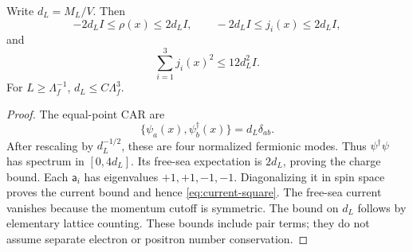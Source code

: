 \begin{lemma}
\label{lem:local}
Write \(d_L=M_L/V\). Then
\begin{equation}
-2d_L I\le\rho(x)\le2d_L I,\qquad
-2d_L I\le j_i(x)\le2d_L I,
\label{eq:local-bounds}
\end{equation}
and
\begin{equation}
\sum_{i=1}^3j_i(x)^2\le12d_L^2I.
\label{eq:current-square}
\end{equation}
For \(L\ge\Lambda_f^{-1}\), \(d_L\le C\Lambda_f^3\).
\end{lemma}
\begin{proof}
The equal-point CAR are
\begin{equation}
\{\psi_a(x),\psi_b^\dagger(x)\}=d_L\delta_{ab}.
\end{equation}
After rescaling by \(d_L^{-1/2}\), these are four normalized fermionic modes.
Thus \(\psi^\dagger\psi\) has spectrum in \([0,4d_L]\). Its free-sea
expectation is \(2d_L\), proving the charge bound.
Each \(\mathsf a_i\) has eigenvalues \(+1,+1,-1,-1\). Diagonalizing it in
spin space proves the current bound and hence \eqref{eq:current-square}.
The free-sea current vanishes because the momentum cutoff is symmetric.
The bound on \(d_L\) follows by elementary lattice counting.
These bounds include pair terms; they do not assume separate electron
or positron number conservation.
\end{proof}

